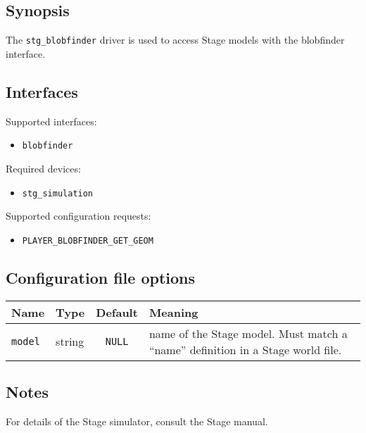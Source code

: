 \subsection*{Synopsis}

The {\tt stg\_blobfinder} driver is used to access Stage models with the
blobfinder interface.

\subsection*{Interfaces}

\noindent Supported interfaces:
\begin{itemize}
\item {\tt blobfinder}
\end{itemize}

\noindent Required devices:
\begin{itemize}
\item {\tt stg\_simulation}
\end{itemize}

\noindent Supported configuration requests:
\begin{itemize}
\item \verb+PLAYER_BLOBFINDER_GET_GEOM+
\end{itemize}


\subsection*{Configuration file options}

\begin{center}
{\small \begin{tabularx}{\columnwidth}{|l|l|c|X|}
\hline
Name & Type & Default & Meaning\\
\hline
{\tt model} & string & {\tt NULL} & name of the Stage model. Must match a ``name'' definition in a Stage world file. \\
\hline
\end{tabularx}}
\end{center}

\subsection*{Notes}

For details of the Stage simulator, consult the Stage manual.

